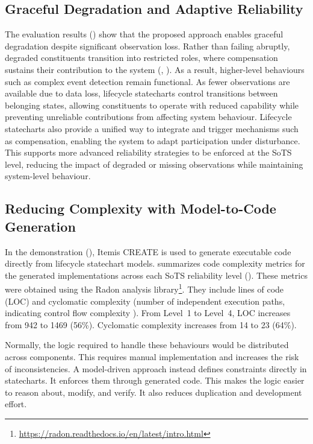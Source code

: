 \subsection{Graceful Degradation and Adaptive Reliability}
The evaluation results () show that the proposed approach enables graceful degradation despite significant observation loss. Rather than failing abruptly, degraded constituents transition into restricted roles, where compensation sustains their contribution to the system (, ). As a result, higher-level behaviours such as complex event detection remain functional. As fewer observations are available due to data loss, lifecycle statecharts control transitions between belonging states, allowing constituents to operate with reduced capability while preventing unreliable contributions from affecting system behaviour. Lifecycle statecharts also provide a unified way to integrate and trigger mechanisms such as compensation, enabling the system to adapt participation under disturbance. This supports more advanced reliability strategies to be enforced at the SoTS level, reducing the impact of degraded or missing observations while maintaining system-level behaviour.

 
\subsection{Reducing Complexity with Model-to-Code Generation}

In the demonstration (), Itemis CREATE is used to generate executable code directly from lifecycle statechart models.  summarizes code complexity metrics for the generated implementations across each SoTS reliability level (). These metrics were obtained using the Radon analysis library\footnote{\url{https://radon.readthedocs.io/en/latest/intro.html}}. They include lines of code (LOC) and cyclomatic complexity (number of independent execution paths, indicating control flow complexity \cite{coleman1994using, oman1992metrics}). From Level~1 to Level~4, LOC increases from 942 to 1469 (56\%). Cyclomatic complexity increases from 14 to 23 (64\%).

Normally, the logic required to handle these behaviours would be distributed across components. This requires manual implementation and increases the risk of inconsistencies. A model-driven approach instead defines constraints directly in statecharts. It enforces them through generated code. This makes the logic easier to reason about, modify, and verify. It also reduces duplication and development effort.


